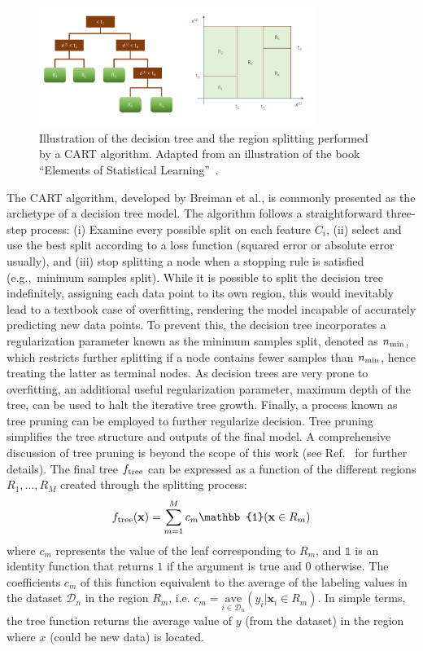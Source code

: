 \documentclass[main]{subfiles}
\begin{document}
\begin{figure}[ht]
  \centering
  \includegraphics[width=0.8\textwidth]{figures/4-ml/decision_tree.pdf}
  \caption{Illustration of the decision tree and the region splitting performed by a CART\autocite{Breiman_2017} algorithm. Adapted from an illustration of the book ``Elements of Statistical Learning''~\cite{Hastie_2009}.}\label{fgr:tree}
\end{figure}

The CART\autocite{Breiman_2017} algorithm, developed by Breiman et al., is commonly presented as the archetype of a decision tree model. The algorithm follows a straightforward three-step process: (i) Examine every possible split on each feature $C_i$, (ii) select and use the best split according to a loss function (squared error or absolute error usually), and (iii) stop splitting a node when a stopping rule is satisfied (e.g.,\ minimum samples split).\autocite{Dension_1998} While it is possible to split the decision tree indefinitely, assigning each data point to its own region, this would inevitably lead to a textbook case of overfitting, rendering the model incapable of accurately predicting new data points. To prevent this, the decision tree incorporates a regularization parameter known as the minimum samples split, denoted as $n_{\text{min}}$, which restricts further splitting if a node contains fewer samples than $n_{\text{min}}$, hence treating the latter as terminal nodes. As decision trees are very prone to overfitting, an additional useful regularization parameter, maximum depth of the tree, can be used to halt the iterative tree growth. Finally, a process known as tree pruning can be employed to further regularize decision. Tree pruning simplifies the tree structure and outputs of the final model. A comprehensive discussion of tree pruning is beyond the scope of this work (see Ref.~\cite{Hastie_2009} for further details). The final tree $f_{\text{tree}}$ can be expressed as a function of the different regions $R_1,\ldots,R_M$ created through the splitting process:
\begin{equation}
  f\e{tree}(\mathbf{x}) = \sum_{m=1}^M c_m \mathbb{1}(\mathbf{x}\in R_m)
\end{equation}
where $c_m$ represents the value of the leaf corresponding to $R_m$, and $\mathbb{1}$ is an identity function that returns $1$ if the argument is true and $0$ otherwise. The coefficients $c_m$ of this function equivalent to the average of the labeling values in the dataset $\mathcal{D}_n$ in the region $R_m$, i.e. $c_m= \underset{i\in \mathcal{D}_n}{\text{ave}}(y_i|\mathbf{x}_i\in R_m)$.
In simple terms, the tree function returns the average value of $y$ (from the dataset) in the region where $x$ (could be new data) is located. 
\end{document}

